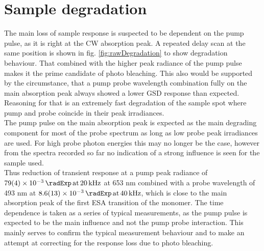 \documentclass[twoside,openright]{scrreprt}
\def\pumpExp#1{\ensuremath{\SI{#1}{\radExp}\,\mathrm{at}\, \SI{20}{\kilo\hertz}}}
\def\probeExp#1{\ensuremath{\SI{#1}{\radExp}\,\mathrm{at}\, \SI{40}{\kilo\hertz}}}
\begin{document}
\section{Sample degradation}\label{sec:degradation}
The main loss of sample response is suspected to be dependent on the pump pulse, as it is right at the CW absorption peak. A repeated delay scan at the same position is shown in fig. \ref{fig:rawDegradation} to show degradation behaviour. That combined with the higher peak radiance of the pump pulse makes it the prime candidate of photo bleaching. This also would be supported by the circumstance, that a pump probe wavelength combination fully on the main absorption peak always showed a lower GSD response than expected. Reasoning for that is an extremely fast degradation of the sample spot where pump and probe coincide in their peak irradiances.\\
The pump pulse on the main absorption peak is expected as the main degrading component for most of the probe spectrum as long as low probe peak irradiances are used. For high probe photon energies this may no longer be the case, however from the spectra recorded so far no indication of a strong influence is seen for the sample used.\\
Thus reduction of transient response at a pump peak radiance of \pumpExp{79(4)e-3} at 653 nm combined with a probe wavelength of 493 nm at \probeExp{8.6(1.3)e-3}, which is close to the main absorption peak of the first ESA transition of the monomer. The time dependence is taken as a series of typical measurements, as the pump pulse is expected to be the main influence and not the pump probe interaction. This mainly serves to confirm the typical measurement behaviour and to make an attempt at correcting for the response loss due to photo bleaching.
\end{document}
